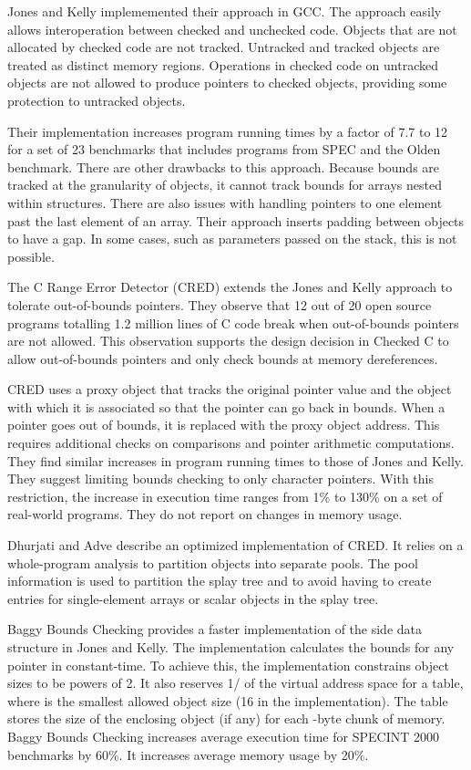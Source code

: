 Jones and Kelly implememented their approach in GCC.   The approach easily allows
interoperation between checked and unchecked code.  Objects that are not allocated by
checked code are not tracked.  Untracked and tracked objects are treated as distinct memory regions.  Operations in checked code on untracked objects are not allowed to produce pointers to checked objects, providing some protection to untracked objects.  

Their implementation increases program running
times by a factor of 7.7 to 12 \cite{Nagarakatte2009} for  a set of
23 benchmarks that includes programs from SPEC and the Olden benchmark.
There are other drawbacks to this approach.
Because bounds are tracked at the granularity of objects, it
cannot track bounds for arrays nested within structures. There are also
issues with handling pointers to one element past the last element of
an array.  Their approach inserts padding between objects to have a gap.  In some
cases, such as parameters passed on the stack, this is not possible.

The C Range Error Detector (CRED) \cite{Ruwase2004} extends the Jones and Kelly
approach to tolerate out-of-bounds pointers.  They observe that 12 out of
20 open source programs totalling 1.2 million lines of C code break when
out-of-bounds pointers are not allowed.   This observation supports the
design decision in Checked C to allow out-of-bounds pointers and only
check bounds at memory dereferences.

CRED uses a proxy object that
tracks the original pointer value and the object with which it is associated
so that the pointer can go back in bounds.  When a pointer goes out of
bounds, it is replaced with the proxy object address.  This requires
additional checks on comparisons and pointer arithmetic computations.
They find similar increases in program running times to those of Jones and
Kelly.  They suggest
limiting bounds checking to only character pointers. With this restriction,
the increase in execution time  ranges from 1\% to 130\% on a set of real-world
programs.  They do not report on changes in memory usage.

Dhurjati and Adve \cite{Dhurjati2006} describe an optimized implementation of
CRED.  It relies on a whole-program analysis to partition
objects into separate pools.  The pool information is used to partition
the splay tree and  to avoid having to create entries for single-element arrays 
or scalar objects in the splay tree.

Baggy Bounds Checking \cite{Akritidis:2009:BBC:1855768.1855772}
provides a faster implementation
of the side data structure in Jones and Kelly.  The implementation 
calculates the bounds for any pointer in constant-time.   To achieve this,
the implementation constrains object sizes to be powers of 2.  It also reserves 
1/ of the virtual address space for a table, where  is the smallest 
allowed object size (16 in the implementation).  The table stores the size of the
enclosing object (if any) for each -byte chunk of memory.   Baggy Bounds 
Checking increases average execution time for SPECINT 2000 benchmarks by 60\%. 
It increases average memory usage by 20\%.

